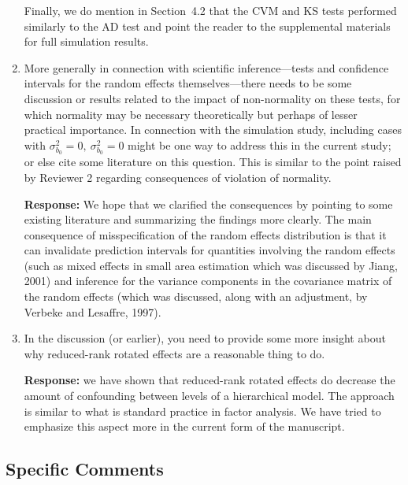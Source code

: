 \documentclass[11pt]{article}
\begin{document}
\begin{enumerate}
Finally, we do mention in Section~4.2 that the CVM and KS tests performed similarly to the AD test and point the reader to the supplemental materials for full simulation results. 


\item More generally in connection with scientific inference---tests and confidence intervals for the random effects themselves---there needs to be some discussion or results related to the impact of non-normality on these tests, for which normality may be necessary theoretically but perhaps of lesser practical importance. In connection with the simulation study, including cases with $\sigma^2_{b_0} = 0, \ \sigma^2_{b_0} = 0$ might be one way to address this in the current study; or else cite some literature on this question. This is similar to the point raised by Reviewer 2 regarding consequences of violation of normality.

\textbf{Response:} We hope that we clarified the consequences by pointing to some existing literature and summarizing the findings more clearly. The main consequence of misspecification of the random effects distribution is that it can invalidate prediction intervals for quantities involving the random effects (such as mixed effects in small area estimation which was discussed by Jiang, 2001) and inference for the variance components in the covariance matrix of the random effects (which was discussed, along with an adjustment, by Verbeke and Lesaffre, 1997).


\item In the discussion (or earlier), you need to provide some more insight about why reduced-rank rotated effects are a reasonable thing to do.

\textbf{Response:} we have shown that reduced-rank rotated effects do decrease the amount of confounding between levels of a hierarchical model. The approach is similar to what is standard practice in factor analysis. We have tried to emphasize this aspect more in the current form of the manuscript.

\end{enumerate}


\subsection*{Specific Comments}
\end{document}
